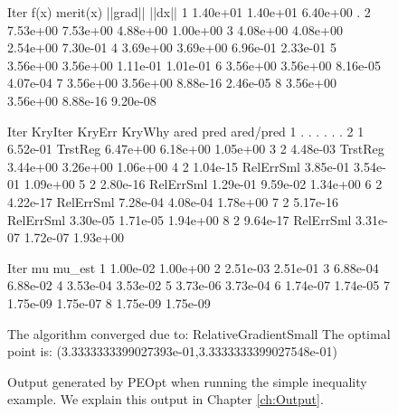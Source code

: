 \begin{figure}
    \begin{lstPeopt}
Iter      f(x)      merit(x)  ||grad||  ||dx||    
1         1.40e+01  1.40e+01  6.40e+00  .         
2         7.53e+00  7.53e+00  4.88e+00  1.00e+00  
3         4.08e+00  4.08e+00  2.54e+00  7.30e-01  
4         3.69e+00  3.69e+00  6.96e-01  2.33e-01  
5         3.56e+00  3.56e+00  1.11e-01  1.01e-01  
6         3.56e+00  3.56e+00  8.16e-05  4.07e-04  
7         3.56e+00  3.56e+00  8.88e-16  2.46e-05  
8         3.56e+00  3.56e+00  8.88e-16  9.20e-08  
\end{lstPeopt}
    \begin{lstPeopt}
Iter      KryIter   KryErr    KryWhy    ared      pred      ared/pred 
1         .         .         .         .         .         .         
2         1         6.52e-01  TrstReg   6.47e+00  6.18e+00  1.05e+00  
3         2         4.48e-03  TrstReg   3.44e+00  3.26e+00  1.06e+00  
4         2         1.04e-15  RelErrSml 3.85e-01  3.54e-01  1.09e+00  
5         2         2.80e-16  RelErrSml 1.29e-01  9.59e-02  1.34e+00  
6         2         4.22e-17  RelErrSml 7.28e-04  4.08e-04  1.78e+00  
7         2         5.17e-16  RelErrSml 3.30e-05  1.71e-05  1.94e+00  
8         2         9.64e-17  RelErrSml 3.31e-07  1.72e-07  1.93e+00 
\end{lstPeopt}
    \begin{lstPeopt}
Iter      mu        mu_est    
1         1.00e-02  1.00e+00  
2         2.51e-03  2.51e-01  
3         6.88e-04  6.88e-02  
4         3.53e-04  3.53e-02  
5         3.73e-06  3.73e-04  
6         1.74e-07  1.74e-05  
7         1.75e-09  1.75e-07  
8         1.75e-09  1.75e-09  
\end{lstPeopt}
    \begin{lstPeopt}
The algorithm converged due to: RelativeGradientSmall
The optimal point is: (3.3333333399027393e-01,3.3333333399027548e-01)
\end{lstPeopt}
    \caption{Output generated by PEOpt when running the simple inequality example.  We explain this output in Chapter \ref{ch:Output}.}
    \label{fig:simpleIneqOut}
\end{figure}
